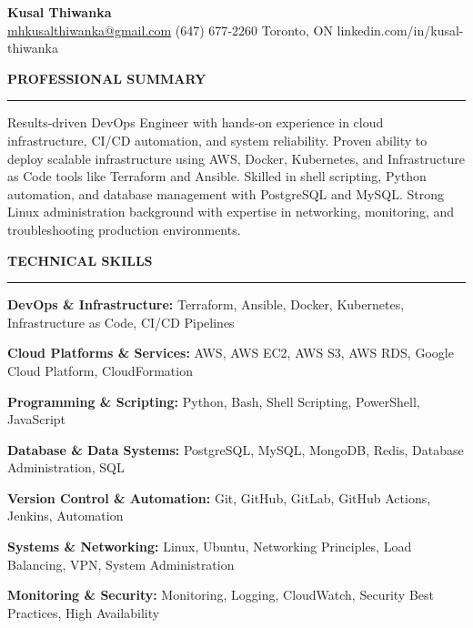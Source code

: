 \documentclass[10pt,letterpaper]{article}
\begin{document}
\begin{center}
{\LARGE\textbf{Kusal Thiwanka}}\\[3pt]
\href{mailto:mhkusalthiwanka@gmail.com}{mhkusalthiwanka@gmail.com}\hspace{2em}%
(647) 677{-}2260\hspace{2em}%
Toronto, ON\hspace{2em}
linkedin.com/in/kusal-thiwanka
\end{center}

\vspace{6pt}

\textbf{PROFESSIONAL SUMMARY}\\[-8pt]
\noindent\rule{\textwidth}{1pt}

\vspace{-2pt}

Results-driven DevOps Engineer with hands-on experience in cloud infrastructure, CI/CD automation, and system reliability. Proven ability to deploy scalable infrastructure using AWS, Docker, Kubernetes, and Infrastructure as Code tools like Terraform and Ansible. Skilled in shell scripting, Python automation, and database management with PostgreSQL and MySQL. Strong Linux administration background with expertise in networking, monitoring, and troubleshooting production environments.

\vspace{8pt}

\textbf{TECHNICAL SKILLS}\\[-8pt]
\noindent\rule{\textwidth}{1pt}

\vspace{-2pt}

\textbf{DevOps \& Infrastructure:} Terraform, Ansible, Docker, Kubernetes, Infrastructure as Code, CI/CD Pipelines

\textbf{Cloud Platforms \& Services:} AWS, AWS EC2, AWS S3, AWS RDS, Google Cloud Platform, CloudFormation

\textbf{Programming \& Scripting:} Python, Bash, Shell Scripting, PowerShell, JavaScript

\textbf{Database \& Data Systems:} PostgreSQL, MySQL, MongoDB, Redis, Database Administration, SQL

\textbf{Version Control \& Automation:} Git, GitHub, GitLab, GitHub Actions, Jenkins, Automation

\textbf{Systems \& Networking:} Linux, Ubuntu, Networking Principles, Load Balancing, VPN, System Administration

\textbf{Monitoring \& Security:} Monitoring, Logging, CloudWatch, Security Best Practices, High Availability
\end{document}

